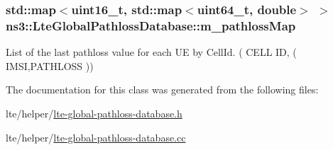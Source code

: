 \subsubsection[{\texorpdfstring{m\+\_\+pathloss\+Map}{m_pathlossMap}}]{\setlength{\rightskip}{0pt plus 5cm}std\+::map$<$uint16\+\_\+t, std\+::map$<$uint64\+\_\+t, double$>$ $>$ ns3\+::\+Lte\+Global\+Pathloss\+Database\+::m\+\_\+pathloss\+Map\hspace{0.3cm}{\ttfamily [protected]}}\hypertarget{classns3_1_1LteGlobalPathlossDatabase_a3a193fa1babca27aa0a2dfccebf8c0ab}{}\label{classns3_1_1LteGlobalPathlossDatabase_a3a193fa1babca27aa0a2dfccebf8c0ab}
List of the last pathloss value for each UE by Cell\+Id. ( C\+E\+LL ID, ( I\+M\+SI,P\+A\+T\+H\+L\+O\+SS )) 

The documentation for this class was generated from the following files\+:\begin{DoxyCompactItemize}
\item 
lte/helper/\hyperlink{lte-global-pathloss-database_8h}{lte-\/global-\/pathloss-\/database.\+h}\item 
lte/helper/\hyperlink{lte-global-pathloss-database_8cc}{lte-\/global-\/pathloss-\/database.\+cc}\end{DoxyCompactItemize}
